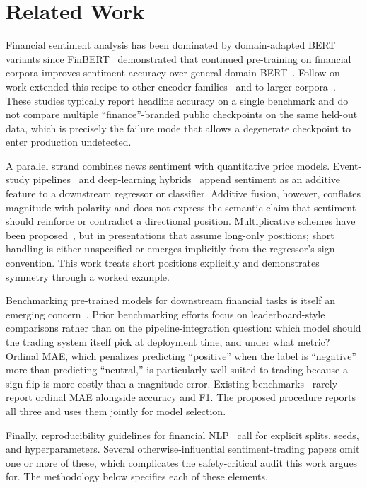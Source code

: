 \documentclass[conference]{IEEEtran}
\begin{document}
\section{Related Work}

Financial sentiment analysis has been dominated by domain-adapted BERT
variants since FinBERT~\cite{araci2019finbert} demonstrated that continued
pre-training on financial corpora improves sentiment accuracy over
general-domain BERT~\cite{devlin2019bert}. Follow-on work extended this
recipe to other encoder families~\cite{yang2020finbert} and to larger
corpora~\cite{liu2023finance}. These studies typically report headline
accuracy on a single benchmark and do not compare multiple
``finance''-branded public checkpoints on the same held-out data, which is
precisely the failure mode that allows a degenerate checkpoint to enter
production undetected.

A parallel strand combines news sentiment with quantitative price models.
Event-study pipelines~\cite{schumaker2009textual} and deep-learning
hybrids~\cite{ding2015deep,nguyen2015topic} append sentiment as an additive
feature to a downstream regressor or classifier. Additive fusion, however,
conflates magnitude with polarity and does not express the semantic claim
that sentiment should reinforce or contradict a directional position.
Multiplicative schemes have been proposed~\cite{bollen2011twitter,
zhang2010trading}, but in presentations that assume long-only positions;
short handling is either unspecified or emerges implicitly from the
regressor's sign convention. This work treats short positions explicitly and
demonstrates symmetry through a worked example.

Benchmarking pre-trained models for downstream financial tasks is itself an
emerging concern~\cite{xie2023wall,shah2022finbench}. Prior benchmarking
efforts focus on leaderboard-style comparisons rather than on the
pipeline-integration question: which model should the trading system itself
pick at deployment time, and under what metric? Ordinal MAE, which penalizes
predicting ``positive'' when the label is ``negative'' more than predicting
``neutral,'' is particularly well-suited to trading because a sign flip is
more costly than a magnitude error. Existing benchmarks~\cite{chen2023eval,
shah2023trillion} rarely report ordinal MAE alongside accuracy and F1. The
proposed procedure reports all three and uses them jointly for model
selection.

Finally, reproducibility guidelines for financial NLP~\cite{dodge2019show,
gundersen2018state} call for explicit splits, seeds, and hyperparameters.
Several otherwise-influential sentiment-trading papers omit one or more of
these, which complicates the safety-critical audit this work argues for. The
methodology below specifies each of these elements.
\end{document}
